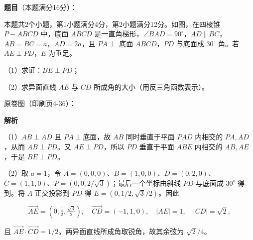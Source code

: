 \begin{answer}

\textbf{题目}（本题满分16分）：

本题共2个小题，第1小题满分4分，第2小题满分12分。如图，在四棱锥 $P-ABCD$ 中，底面 $ABCD$ 是一直角梯形，$\angle BAD=90^\circ$，$AD\parallel BC$，$AB=BC=a$，$AD=2a$，且 $PA\perp$ 底面 $ABCD$，$PD$ 与底面成 $30^\circ$ 角。若 $AE\perp PD$，$E$ 为垂足。

（1）求证：$BE\perp PD$；

（2）求异面直线 $AE$ 与 $CD$ 所成角的大小（用反三角函数表示）。

原卷图（印刷页4-36）：
\nopagebreak[4]
\begin{center}\end{center}
\nopagebreak[4]
\textbf{解析}

（1）$AB\perp AD$ 且 $PA\perp$底面，故 $AB$ 同时垂直于平面 $PAD$ 内相交的 $PA,AD$，从而 $AB\perp PD$。又 $AE\perp PD$，所以 $PD$ 垂直于平面 $ABE$ 内相交的 $AB,AE$，于是 $BE\perp PD$。

（2）取 $a=1$，令 $A=(0,0,0)$、$B=(1,0,0)$、$D=(0,2,0)$、$C=(1,1,0)$、$P=(0,0,2/\sqrt3)$；最后一个坐标由斜线 $PD$ 与底面成 $30^\circ$ 得到。将 $A$ 正交投影到 $PD$ 得 $E=(0,1/2,\sqrt3/2)$。因此

\nopagebreak[4]
\[
\overrightarrow{AE}=(0,\tfrac12,\tfrac{\sqrt3}{2}),\quad
\overrightarrow{CD}=(-1,1,0),\quad
|AE|=1,\quad |CD|=\sqrt2,
\]

且 $\overrightarrow{AE}\cdot\overrightarrow{CD}=1/2$。两异面直线所成角取锐角，故其余弦为 $\sqrt2/4$。


\end{answer}
